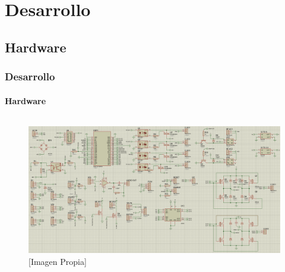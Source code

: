 \section{Desarrollo}

\subsection{Hardware}
\begin{frame}
\frametitle{Desarrollo}
\framesubtitle{Hardware}

\begin{columns}
	
\begin{figure}
	\centering
	\caption{[Imagen Propia]}
	\label{fig:esq}
	\includegraphics[width=\linewidth]{Imagenes/Proteus}
\end{figure}


\end{columns}
\end{frame}
